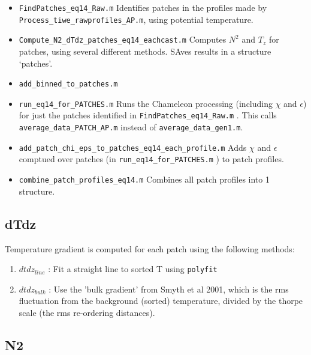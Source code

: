 \documentclass[11pt]{article}
\begin{document}
\begin{itemize}

\item \verb+FindPatches_eq14_Raw.m+ Identifies patches in the profiles made by \verb+Process_tiwe_rawprofiles_AP.m+, using potential temperature.

\item \verb+Compute_N2_dTdz_patches_eq14_eachcast.m+ Computes $N^2$ and $T_z$ for patches, using several different methods. SAves results in a structure `patches'.

\item \verb+add_binned_to_patches.m+

\item \verb+run_eq14_for_PATCHES.m+ Runs the Chameleon processing (including $\chi$ and $\epsilon$) for just the patches identified in \verb+FindPatches_eq14_Raw.m+ . This calls \verb+average_data_PATCH_AP.m+ instead of \verb+average_data_gen1.m+.

\item \verb+add_patch_chi_eps_to_patches_eq14_each_profile.m+ Adds  $\chi$ and $\epsilon$ comptued over patches (in \verb+run_eq14_for_PATCHES.m+ ) to patch profiles.

\item \verb+combine_patch_profiles_eq14.m+ Combines all patch profiles into 1 structure.


\end{itemize}

\medskip

\subsection{dTdz}

Temperature gradient is computed for each patch using the following methods:
\begin{enumerate}
\item $dtdz_{line}$ : Fit a straight line to sorted T using \verb+polyfit+
\item $dtdz_{bulk}$ : Use the 'bulk gradient' from Smyth et al 2001, which is the rms fluctuation from the background (sorted) temperature, divided by the thorpe scale (the rms re-ordering distances).
\end{enumerate}


\subsection{N2}
\end{document}
